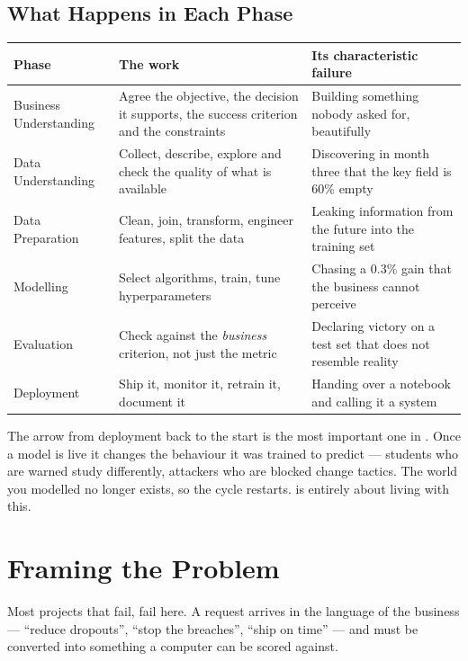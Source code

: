 \subsection{What Happens in Each Phase}

\begin{longtable}{@{}L{2.9cm}L{5.3cm}L{6.2cm}@{}}
\toprule
{}
\textbf{Phase} & \textbf{The work} & \textbf{Its characteristic failure} \\
\midrule
\endhead
Business Understanding & Agree the objective, the decision it supports, the success criterion and the constraints & Building something nobody asked for, beautifully \\
Data Understanding & Collect, describe, explore and check the quality of what is available & Discovering in month three that the key field is 60\% empty \\
Data Preparation & Clean, join, transform, engineer features, split the data & Leaking information from the future into the training set \\
Modelling & Select algorithms, train, tune hyperparameters & Chasing a 0.3\% gain that the business cannot perceive \\
Evaluation & Check against the \emph{business} criterion, not just the metric & Declaring victory on a test set that does not resemble reality \\
Deployment & Ship it, monitor it, retrain it, document it & Handing over a notebook and calling it a system \\
\bottomrule
\end{longtable}

\begin{conceptbox}
The arrow from deployment back to the start is the most important one in
. Once a model is live it changes the behaviour it was trained to
predict --- students who are warned study differently, attackers who are blocked
change tactics. The world you modelled no longer exists, so the cycle restarts.
 is entirely about living with this.
\end{conceptbox}

\section{Framing the Problem}

Most projects that fail, fail here. A request arrives in the language of the
business --- ``reduce dropouts'', ``stop the breaches'', ``ship on time'' --- and
must be converted into something a computer can be scored against.

